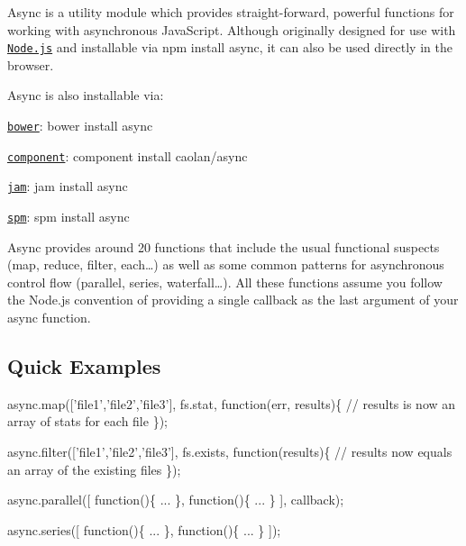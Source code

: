\href{https://travis-ci.org/caolan/async}{\tt } \href{https://www.npmjs.org/package/async}{\tt } \href{https://coveralls.io/r/caolan/async?branch=master}{\tt } \href{https://gitter.im/caolan/async?utm_source=badge&utm_medium=badge&utm_campaign=pr-badge&utm_content=badge}{\tt }

Async is a utility module which provides straight-\/forward, powerful functions for working with asynchronous Java\+Script. Although originally designed for use with \href{http://nodejs.org}{\tt Node.\+js} and installable via {\ttfamily npm install async}, it can also be used directly in the browser.

Async is also installable via\+:


\begin{DoxyItemize}
\item \href{http://bower.io/}{\tt bower}\+: {\ttfamily bower install async}
\item \href{https://github.com/component/component}{\tt component}\+: {\ttfamily component install caolan/async}
\item \href{http://jamjs.org/}{\tt jam}\+: {\ttfamily jam install async}
\item \href{http://spmjs.io/}{\tt spm}\+: {\ttfamily spm install async}
\end{DoxyItemize}

Async provides around 20 functions that include the usual \textquotesingle{}functional\textquotesingle{} suspects ({\ttfamily map}, {\ttfamily reduce}, {\ttfamily filter}, {\ttfamily each}…) as well as some common patterns for asynchronous control flow ({\ttfamily parallel}, {\ttfamily series}, {\ttfamily waterfall}…). All these functions assume you follow the Node.\+js convention of providing a single callback as the last argument of your {\ttfamily async} function.

\subsection*{Quick Examples}


\begin{DoxyCode}
async.map(['file1','file2','file3'], fs.stat, function(err, results)\{
    // results is now an array of stats for each file
\});

async.filter(['file1','file2','file3'], fs.exists, function(results)\{
    // results now equals an array of the existing files
\});

async.parallel([
    function()\{ ... \},
    function()\{ ... \}
], callback);

async.series([
    function()\{ ... \},
    function()\{ ... \}
]);
\end{DoxyCode}


